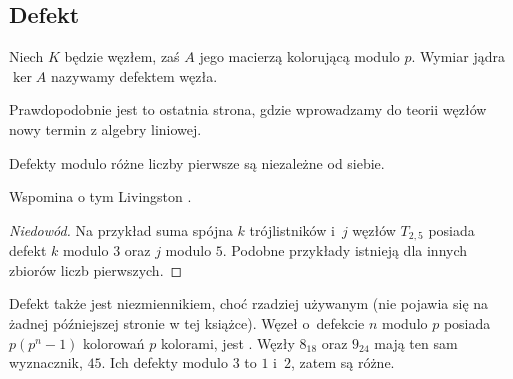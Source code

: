 
\subsection{Defekt}
%
\begin{definition}[defekt]
    Niech $K$ będzie węzłem, zaś $A$ jego macierzą kolorującą modulo $p$.
    Wymiar jądra $\ker A$ nazywamy defektem węzła.
\end{definition}

Prawdopodobnie jest to ostatnia strona, gdzie wprowadzamy do teorii węzłów nowy termin z algebry liniowej.

\begin{proposition}
\label{no_relation_defects}%
    Defekty modulo różne liczby pierwsze są niezależne od siebie.
\end{proposition}

Wspomina o tym Livingston \cite[s. 145]{livingston1993}.

\begin{proof}[Niedowód]
    Na przykład suma spójna $k$ trójlistników i~$j$ węzłów $T_{2,5}$ posiada defekt $k$ modulo $3$ oraz $j$ modulo $5$.
    Podobne przykłady istnieją dla innych zbiorów liczb pierwszych.
\end{proof}

Defekt także jest niezmiennikiem, choć rzadziej używanym (nie pojawia się na żadnej późniejszej stronie w tej książce).
Węzeł o~defekcie $n$ modulo $p$ posiada $p(p^n-1)$ kolorowań $p$ kolorami, jest \cite[twierdzenie 2]{taalman2005}.
Węzły $8_{18}$ oraz $9_{24}$ mają ten sam wyznacznik, $45$.
Ich defekty modulo $3$ to $1$ i~$2$, zatem są różne.
%

